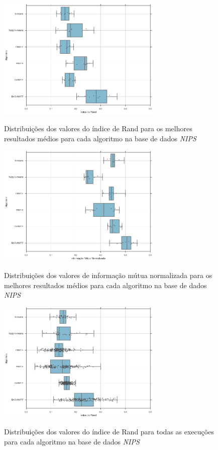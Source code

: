 \documentclass[
    12pt,                %
    oneside,            %
    a4paper,            %
    english,            %
    brazil                %
    ]{abntex2ppgsi}
\begin{document}
\begin{figure}[H]
    \centering
    \caption{Distribuições dos valores do índice de Rand para os melhores resultados médios para cada algoritmo na base de dados \textit{NIPS}}
    \includegraphics[width=0.7\textwidth]{img/boxplot-rand-nips.png}
    \label{fig:boxplot-rand:nips}
\end{figure}

\begin{figure}[H]
    \centering
    \caption{Distribuições dos valores de informação mútua normalizada para os melhores resultados médios para cada algoritmo na base de dados \textit{NIPS}}
    \includegraphics[width=0.7\textwidth]{img/boxplot-nmi-nips.png}
    \label{fig:boxplot-nmi:nips}
\end{figure}

\begin{figure}[H]
    \centering
    \caption{Distribuições dos valores do índice de Rand para todas as execuções para cada algoritmo na base de dados \textit{NIPS}}
    \includegraphics[width=0.7\textwidth]{img/boxplot-all-rand-nips.png}
    \label{fig:boxplot-all-rand:nips}
\end{figure}
\end{document}
